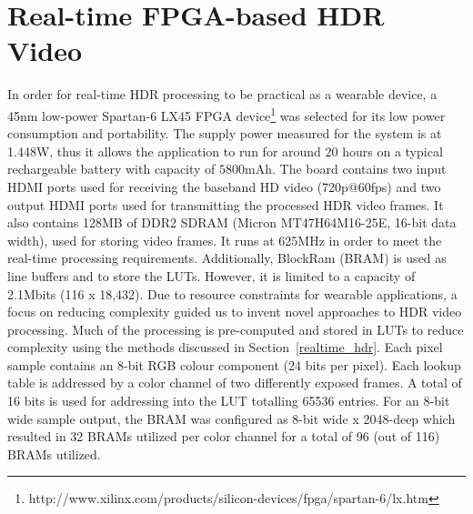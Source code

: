 %
%


\section{Real-time FPGA-based HDR Video}

In order for real-time HDR processing to be practical as a wearable device, a 45nm
low-power Spartan-6 LX45 FPGA
device\footnote{http://www.xilinx.com/products/silicon-devices/fpga/spartan-6/lx.htm}
was selected for its low power consumption and portability. 
The supply power measured for the system is at 1.448W, thus it allows the application to run for 
around $20$ hours on a typical rechargeable battery with capacity of $5800$mAh.
The board contains two input HDMI ports used for receiving the baseband HD video
(720p@60fps) and two output HDMI ports used for transmitting the
processed HDR video frames. It also contains 128MB of DDR2 SDRAM
(Micron MT47H64M16-25E, 16-bit data width), used for storing video
frames. It runs at 625MHz in order to meet the real-time processing
requirements. Additionally, BlockRam (BRAM) is used as line buffers
and to store the LUTs. However, it is limited to a capacity of 2.1Mbits
(116 x 18,432).  Due to resource constraints for wearable applications, a focus on reducing
complexity guided us to invent novel approaches to HDR video processing.  Much of
the processing is pre-computed and stored in LUTs to
reduce complexity using the methods discussed in
Section~\ref{realtime_hdr}.  Each pixel sample contains an 8-bit RGB
colour component (24 bits per pixel).  Each lookup table is
addressed by a color channel of two differently exposed frames.  A
total of 16 bits is used for addressing into the LUT totalling
65536 entries.  For an 8-bit wide sample output, the BRAM was configured
as 8-bit wide x 2048-deep which resulted in 32 BRAMs utilized per
color channel for a total of 96 (out of 116) BRAMs utilized.

